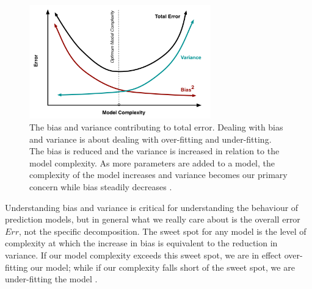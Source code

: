 \begin{figure}[H]
  \centering
    \includegraphics[width=0.7\textwidth]{images/biasvariance.png}
    \caption{The bias and variance contributing to total error. Dealing with bias and variance is about dealing with over-fitting and under-fitting. The bias is reduced and the variance is increased in relation to the model complexity. As more parameters are added to a model, the complexity of the model increases and variance becomes our primary concern while bias steadily decreases \citep{fortmann2012understanding}.}  
\end{figure}

Understanding bias and variance is critical for understanding the behaviour of prediction models, but in general what we really care about is the overall error $Err$, not the specific decomposition. The sweet spot for any model is the level of complexity at which the increase in bias is equivalent to the reduction in variance. If our model complexity exceeds this sweet spot, we are in effect over-fitting our model; while if our complexity falls short of the sweet spot, we are under-fitting the model \citep{fortmann2012understanding}.









